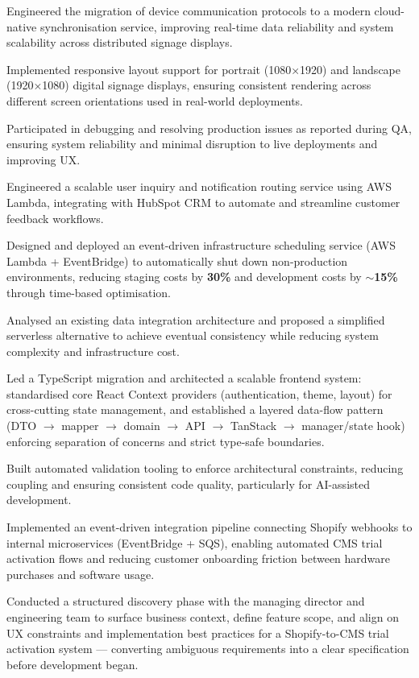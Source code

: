 \documentclass[letterpaper,11pt]{article}
\newcommand{\resumeItem}[1]{
  \item\small #1
}
\begin{document}
                \resumeItem{Engineered the migration of device communication protocols to a modern cloud-native synchronisation service, improving real-time data reliability and system scalability across distributed signage displays.}
                \resumeItem{Implemented responsive layout support for portrait (1080×1920) and landscape (1920×1080) digital signage displays, ensuring consistent rendering across different screen orientations used in real-world deployments.}
                \resumeItem{Participated in debugging and resolving production issues as reported during QA, ensuring system reliability and minimal disruption to live deployments and improving UX.}
                \resumeItem{Engineered a scalable user inquiry and notification routing service using AWS Lambda, integrating with HubSpot CRM to automate and streamline customer feedback workflows.}
                \resumeItem{Designed and deployed an event-driven infrastructure scheduling service (AWS Lambda + EventBridge) to automatically shut down non-production environments, reducing staging costs by \textbf{30\%} and development costs by \textbf{$\sim$15\%} through time-based optimisation.}
                \resumeItem{Analysed an existing data integration architecture and proposed a simplified serverless alternative to achieve eventual consistency while reducing system complexity and infrastructure cost.}
                \resumeItem{Led a TypeScript migration and architected a scalable frontend system: standardised core React Context providers (authentication, theme, layout) for cross-cutting state management, and established a layered data-flow pattern (DTO $\rightarrow$ mapper $\rightarrow$ domain $\rightarrow$ API $\rightarrow$ TanStack $\rightarrow$ manager/state hook) enforcing separation of concerns and strict type-safe boundaries.}
                \resumeItem{Built automated validation tooling to enforce architectural constraints, reducing coupling and ensuring consistent code quality, particularly for AI-assisted development.}
                \resumeItem{Implemented an event-driven integration pipeline connecting Shopify webhooks to internal microservices (EventBridge + SQS), enabling automated CMS trial activation flows and reducing customer onboarding friction between hardware purchases and software usage.}
                \resumeItem{Conducted a structured discovery phase with the managing director and engineering team to surface business context, define feature scope, and align on UX constraints and implementation best practices for a Shopify-to-CMS trial activation system — converting ambiguous requirements into a clear specification before development began.}
\end{document}
